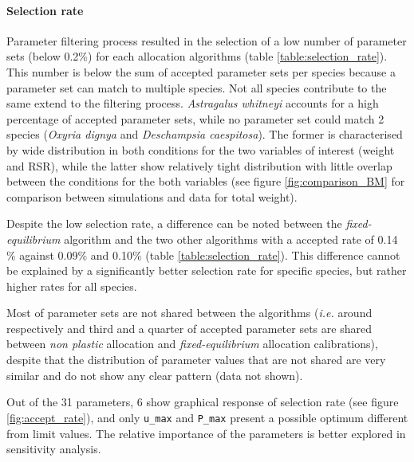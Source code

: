 \paragraph{Selection rate}
Parameter filtering process resulted in the selection of a low number of parameter sets (below 0.2\%) for each allocation algorithms (table \ref{table:selection_rate}). This number is below the sum of accepted parameter sets per species because a parameter set can match to multiple species. Not all species contribute to the same extend to the filtering process. \textit{Astragalus whitneyi} accounts for a high percentage of accepted parameter sets, while no parameter set could match 2 species (\textit{Oxyria dignya} and \textit{Deschampsia caespitosa}). The former is characterised by wide distribution in both conditions for the two variables of interest (weight and RSR), while the latter show relatively tight distribution with little overlap between the conditions for the both variables (see figure \ref{fig:comparison_BM} for comparison between simulations and data for total weight).


Despite the low selection rate, a difference can be noted between the \textit{fixed-equilibrium} algorithm and the two other algorithms with a accepted rate of 0.14 \% against 0.09\% and 0.10\% (table \ref{table:selection_rate}). This difference cannot be explained by a significantly better selection rate for specific species, but rather higher rates for all species.

Most of parameter sets are not shared between the algorithms (\textit{i.e.} around respectively and third and a quarter of accepted parameter sets are shared between \textit{non plastic} allocation and \textit{fixed-equilibrium} allocation calibrations), despite that the distribution of parameter values that are not shared are very similar and do not show any clear pattern (data not shown).

Out of the 31 parameters, 6 show graphical response of selection rate (see figure \ref{fig:accept_rate}), and only  \texttt{u\_max} and \texttt{P\_max} present a possible optimum different from limit values. The relative importance of the parameters is better explored in sensitivity analysis.





